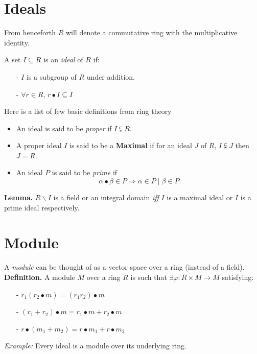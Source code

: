 \documentclass[twoside]{article}
\begin{document}


\section{Ideals}
    From henceforth $R$ will denote a commutative ring with the multiplicative identity.\\
    \begin{definition} A set $I \subseteq R$ is an {\it ideal} of $R$ if:
    \begin{enumerate}
        \item[-] $I$ is a subgroup of $R$ under addition.
        \item[-] $\forall r \in R$,  $r\bullet I \subseteq I$
    \end{enumerate}
    \end{definition}
    Here is a list of few basic definitions from ring theory
    \begin{itemize}
         
    \item An ideal is said to be \emph{proper} if $I\subsetneqq R$.\\
    \item A proper ideal $I$ is said to be a \textbf{Maximal} if for an ideal $J$ of $R$, $I\subsetneqq J$ then $J=R$.
    \item An ideal $P$ is said to be {\it prime} if $$\alpha\bullet\beta\in P\Rightarrow \alpha\in P \mid \beta \in P$$
    \end{itemize}
    
    {\bf Lemma.} $R\backslash I$ is a field or an integral domain {\it iff} $I$ is a maximal ideal or $I$ is a prime ideal respectively.
    
\section{Module}
    A {\it module} can be thought of as a vector space over a ring (instead of a field).\\
    {\bf Definition.} A module $M$ over a ring $R$ is such that $\exists\varphi : R\times M\to M$ satisfying:
    \begin{enumerate}
        \item[-] $r_1({r_2}\bullet m) = ({r_1}{r_2})\bullet m$
        \item[-] $({r_1}+{r_2})\bullet m = {r_1}\bullet m + {r_2}\bullet m$
        \item[-] $r\bullet ({m_1}+{m_2}) = r\bullet {m_1} + r\bullet {m_2}$
    \end{enumerate}
    {\it Example:} Every ideal is a module over its underlying ring.
    
\end{document}
